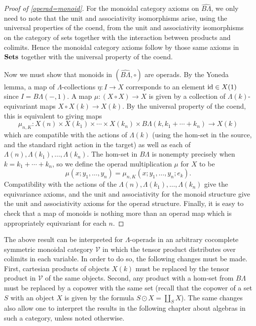 \begin{proof}[Proof of \cref{operad=monoid}]
For the monoidal category axioms on $\widehat{B\Lambda}$, we only need to note that the unit and associativity isomorphisms arise, using the universal properties of the coend, from the unit and associativity isomorphisms on the category of sets together with the interaction between products and colimits. Hence the monoidal category axioms follow by those same axioms in $\mathbf{Sets}$ together with the universal property of the coend.

Now we must show that monoids in $(\widehat{B\Lambda}, \circ)$ are operads. By the Yoneda lemma, a map of $\Lambda$-collections $\eta \colon I \rightarrow X$ corresponds to an element $\textrm{id} \in X(1)$ since $I = B\Lambda(-,1)$. A map $\mu \colon (X \circ X) \rightarrow X$ is given by a collection of $\Lambda(k)$-equivariant maps $X \circ X (k) \rightarrow X(k)$. By the universal property of the coend, this is equivalent to giving maps
  \[
    \mu_{n, K} \colon X(n) \times X(k_{1}) \times \cdots \times X(k_{n}) \times B\Lambda(k, k_{1}+\cdots +k_{n}) \rightarrow X(k)
  \]
which are compatible with the actions of $\Lambda(k)$ (using the hom-set in the source, and the standard right action in the target) as well as each of $\Lambda(n), \Lambda(k_{1}), \ldots, \Lambda(k_{n})$. The hom-set in $B\Lambda$ is nonempty precisely when $k=k_{1} + \cdots + k_{n}$, so we define the operad multiplication $\mu$ for $X$ to be
  \[
    \mu (x; y_{1}, \ldots, y_{n}) = \mu_{n, K}(x; y_{1}, \ldots, y_{n}; e_{k}).
  \]
Compatibility with the actions of the  $\Lambda(n), \Lambda(k_{1}), \ldots, \Lambda(k_{n})$ give the equivariance axioms, and the unit and associativity for the monoid structure give the unit and associativity axioms for the operad structure. Finally, it is easy to check that a map of monoids is nothing more than an operad map which is appropriately equivariant for each $n$.
\end{proof}

\begin{rem}
The above result can be interpreted for $\Lambda$-operads in an arbitrary cocomplete symmetric monoidal category $\mathcal{V}$ in which the tensor product distributes over colimits in each variable. In order to do so, the following changes must be made. First, cartesian products of objects $X(k)$ must be replaced by the tensor product in $\mathcal{V}$ of the same objects. Second, any product with a hom-set from $B\Lambda$ must be replaced by a copower with the same set (recall that the copower of a set $S$ with an object $X$ is given by the formula $S \odot X = \coprod_{S} X$). The same changes also allow one to interpret the results in the following chapter about algebras in such a category, unless noted otherwise.
\end{rem}


